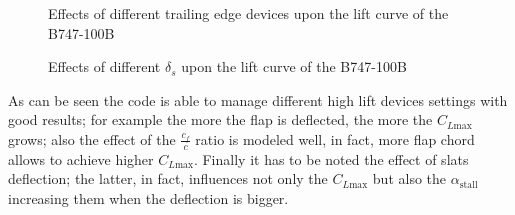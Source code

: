 %
\begin{figure}[H]
\centering

\caption{Effects of different trailing edge devices upon the lift curve of the B747-100B}
\end{figure}
%
\begin{figure}[H]
\centering

\caption{Effects of different $\delta_s$ upon the lift curve of the B747-100B}
\end{figure}
%
\noindent
As can be seen the code is able to manage different high lift devices settings with good results; for example the more the flap is deflected, the more the $C_{L\text{max}}$ grows; also the effect of the $\frac{c_f}{c}$ ratio is modeled well, in fact, more flap chord allows to achieve higher $C_{L\text{max}}$. Finally it has to be noted the effect of slats deflection; the latter, in fact, influences not only the $C_{L\text{max}}$ but also the $\alpha_{\text{stall}}$ increasing them when the deflection is bigger.
